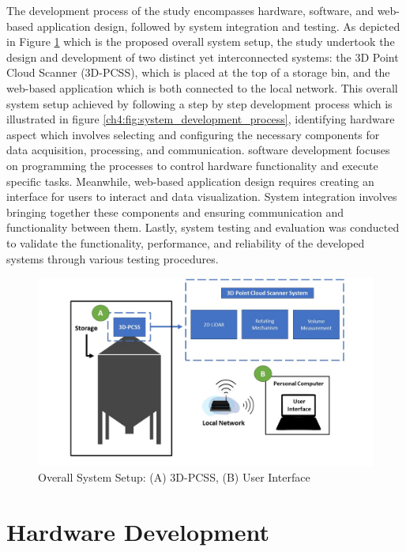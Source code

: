 The development process of the study encompasses hardware, software, and web-based application design, followed by system integration and testing. As depicted in Figure \ref{ch4:fig:overall_system_setup_development} which is the proposed overall system setup, the study undertook the design and development of two distinct yet interconnected systems: the 3D Point Cloud Scanner (3D-PCSS), which is placed at the top of a storage bin, and the web-based application which is both connected to the local network. This overall system setup achieved by following a step by step development process which is illustrated in figure \ref{ch4:fig:system_development_process}, identifying hardware aspect which involves selecting and configuring the necessary components for data acquisition, processing, and communication. software development focuses on programming the processes to control hardware functionality and execute specific tasks. Meanwhile, web-based application design requires creating an interface for users to interact and data visualization. System integration involves bringing together these components and ensuring communication and functionality between them. Lastly, system testing and evaluation was conducted to validate the functionality, performance, and reliability of the developed systems through various testing procedures.

\begin{figure}[H]
	\centering
	\includegraphics[width=1\textwidth]{Figures/system_analysis}
	\caption{Overall System Setup: (A) 3D-PCSS, (B) User Interface}
	\label{ch4:fig:overall_system_setup_development}
\end{figure}

\section{Hardware Development}
\label{ch4:sec:hardaware_design}


